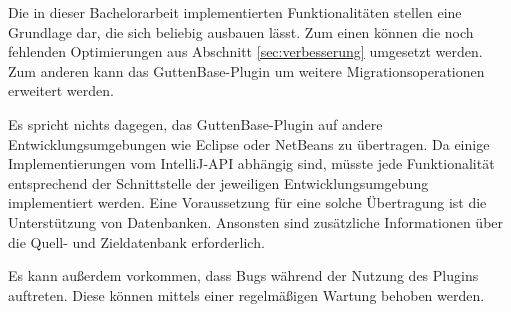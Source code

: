 Die in dieser Bachelorarbeit implementierten Funktionalitäten stellen eine Grundlage dar, die sich beliebig ausbauen lässt. Zum einen können die noch fehlenden Optimierungen aus Abschnitt \ref{sec:verbesserung} umgesetzt werden. Zum anderen kann das GuttenBase-Plugin um weitere Migrationsoperationen erweitert werden.

Es spricht nichts dagegen, das GuttenBase-Plugin auf andere Entwicklungsumgebungen wie Eclipse oder NetBeans zu übertragen. Da einige Implementierungen vom IntelliJ-API abhängig sind, müsste jede Funktionalität entsprechend der Schnittstelle der jeweiligen Entwicklungsumgebung implementiert werden. Eine Voraussetzung für eine solche Übertragung ist die Unterstützung von Datenbanken. Ansonsten sind zusätzliche Informationen über die Quell- und Zieldatenbank erforderlich.

Es kann außerdem vorkommen, dass Bugs während der Nutzung des Plugins auftreten. Diese können mittels einer regelmäßigen Wartung behoben werden.